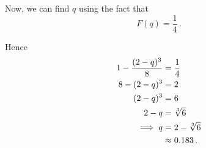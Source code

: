 \begin{subquestions}
\begin{subsubquestions}
Now, we can find $q$ using the fact that
\begin{equation}
	F(q) = \frac{1}{4}\,.
\end{equation}

Hence
\begin{align}
	1 - \frac{(2-q)^3}{8} & = \frac{1}{4} \nonumber \\
	            8 - (2-q)^3 & = 2 \nonumber \\
	                (2-q)^3 & = 6 \nonumber \\
	                2-q & = \sqrt[3]{6} \nonumber \\
	                \implies q & = 2 - \sqrt[3]{6} \nonumber \\
	                & \approx 0.183 \,.
\end{align}

\end{subsubquestions}

\end{subquestions}



